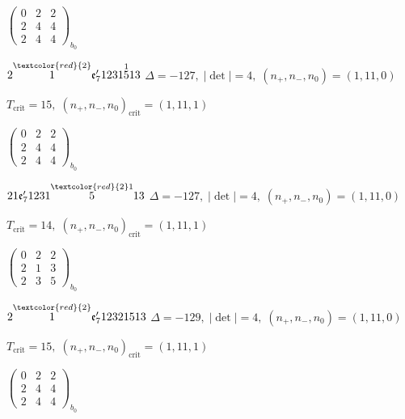 \documentclass[10pt]{article}
\begin{document}
\hspace{2em}$\left(\begin{smallmatrix}0 & 2 & 2 \\ 2 & 4 & 4 \\ 2 & 4 & 4\end{smallmatrix}\right)_{\!b_0}$

\smallskip

$2\overset{\textcolor{red}{2}}{1}\mathfrak{e}_7'1231\overset{1}{5}13$ \quad $\Delta=-127,\; |\det|=4,\; (n_+,n_-,n_0)=(1,11,0)$

\hspace{1em}$T_{\text{crit}}=15,\; (n_+,n_-,n_0)_{\text{crit}}=(1,11,1)$

\hspace{2em}$\left(\begin{smallmatrix}0 & 2 & 2 \\ 2 & 4 & 4 \\ 2 & 4 & 4\end{smallmatrix}\right)_{\!b_0}$

$21\mathfrak{e}_7'1231\overset{\textcolor{red}{2}1}{5}13$ \quad $\Delta=-127,\; |\det|=4,\; (n_+,n_-,n_0)=(1,11,0)$

\hspace{1em}$T_{\text{crit}}=14,\; (n_+,n_-,n_0)_{\text{crit}}=(1,11,1)$

\hspace{2em}$\left(\begin{smallmatrix}0 & 2 & 2 \\ 2 & 1 & 3 \\ 2 & 3 & 5\end{smallmatrix}\right)_{\!b_0}$

\smallskip

$2\overset{\textcolor{red}{2}}{1}\mathfrak{e}_7'12321513$ \quad $\Delta=-129,\; |\det|=4,\; (n_+,n_-,n_0)=(1,11,0)$

\hspace{1em}$T_{\text{crit}}=15,\; (n_+,n_-,n_0)_{\text{crit}}=(1,11,1)$

\hspace{2em}$\left(\begin{smallmatrix}0 & 2 & 2 \\ 2 & 4 & 4 \\ 2 & 4 & 4\end{smallmatrix}\right)_{\!b_0}$

\smallskip
\end{document}
